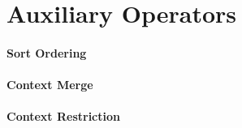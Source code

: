 \section{Auxiliary Operators}
\paragraph{\textbf{Sort Ordering}}
\paragraph{\textbf{Context Merge}}
\paragraph{\textbf{Context Restriction}}

